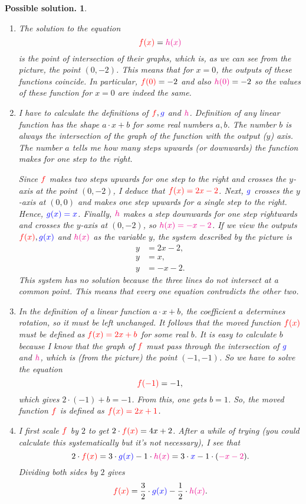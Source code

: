 \documentclass[a4paper,11pt]{article}
\newtheorem*{solution}{Possible solution.}
\newcommand{\tr}{\textcolor{red}}
\newcommand{\tb}{\textcolor{blue}}
\newcommand{\tm}{\textcolor{magenta}}
\begin{document}
\begin{solution}\hfill
 \begin{enumerate}[label=(\alph*),topsep=0pt]
  \item The solution to the equation
   \[
    \tr{f(x)} = \tm{h(x)}
   \]
   is the point of intersection of their graphs, which is, as we can see from
   the picture, the point $(0,-2)$. This means that for $x = 0$, the outputs of
   these functions coincide. In particular, $\tr{f(0)} = -2$ and also $\tm{h(0)}
   = -2$ so the values of these function for $x = 0$ are indeed the same.
  \item I have to calculate the definitions of $\tr{f}, \tb{g}$ and $\tm{h}$.
   Definition of any linear function has the shape $a \cdot x + b$ for some real
   numbers $a,b$. The number $b$ is always the intersection of the graph of the
   function with the output ($y$) axis. The number $a$ tells me how many steps
   upwards (or downwards) the function makes for one step to the right.

   Since $\tr{f}$ makes two steps upwards for one step to the right and crosses
   the $y$-axis at the point $(0,-2)$, I deduce that $\tr{f(x) = 2x - 2}$. Next,
   $\tb{g}$ crosses the $y$-axis at $(0,0)$ and makes one step upwards for a
   single step to the right. Hence, $\tb{g(x) = x}$. Finally, $\tm{h}$ makes a
   step downwards for one step rightwards and crosses the $y$-axis at $(0,-2)$,
   so $\tm{h(x) = -x - 2}$. If we view the outputs $\tr{f(x)},\tb{g(x)}$ and
   $\tm{h(x)}$ as the variable $y$, the system described by the picture is
   \begin{align*}
    y &= 2x - 2, \\
    y &= x, \\
    y &= -x - 2.
   \end{align*}
   This system has no solution because the three lines do not intersect at a
   common point. This means that every one equation contradicts the other two.
  \item In the definition of a linear function $a \cdot x + b$, the coefficient
   $a$ determines rotation, so it must be left unchanged. It follows that the
   moved function $\tr{f(x)}$ must be defined as $\tr{f(x) = 2x + b}$ for some
   real $b$. It is easy to calculate $b$ because I know that the graph of
   $\tr{f}$ must pass through the intersection of $\tb{g}$ and $\tm{h}$, which
   is (from the picture) the point $(-1,-1)$. So we have to solve the equation
   \[
    \tr{f(-1)} = -1,
   \]
   which gives $2 \cdot (-1) + b = -1$. From this, one gets $b = 1$. So, the
   moved function $\tr{f}$ is defined as $\tr{f(x) = 2x + 1}$.
  \item I first scale $\tr{f}$ by $2$ to get $2 \cdot \tr{f(x)} = 4x + 2$. After
   a while of trying (you could calculate this systematically but it's not
   necessary), I see that
   \[
    2 \cdot \tr{f(x)} = 3 \cdot \tb{g(x)} - 1 \cdot \tm{h(x)} = 3 \cdot \tb{x}
    -1 \cdot (\tm{-x-2}).
   \]
   Dividing both sides by $2$ gives
   \[
    \tr{f(x)} = \frac{3}{2} \cdot \tb{g(x)} -\frac{1}{2} \cdot \tm{h(x)}.
   \]
 \end{enumerate}
\end{solution}
\end{document}
